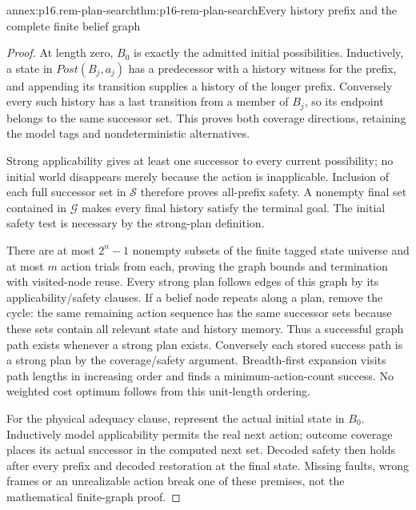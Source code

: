 \begin{annexitem}{annex:p16.rem-plan-search}{thm:p16-rem-plan-search}{Every history prefix and the complete finite belief graph}
\begin{proof}
At length zero, \(B_0\) is exactly the admitted initial possibilities.
Inductively, a state in \(Post(B_j,a_j)\) has a predecessor with a
history witness for the prefix, and appending its transition supplies a
history of the longer prefix. Conversely every such history has a last
transition from a member of \(B_j\), so its endpoint belongs to the
same successor set. This proves both coverage directions, retaining the
model tags and nondeterministic alternatives.

Strong applicability gives at least one successor to every current
possibility; no initial world disappears merely because the action is
inapplicable. Inclusion of each full successor set in \(\mathcal S\)
therefore proves all-prefix safety. A nonempty final set contained in
\(\mathcal G\) makes every final history satisfy the terminal goal.
The initial safety test is necessary by the strong-plan definition.

There are at most \(2^n-1\) nonempty subsets of the finite tagged state
universe and at most \(m\) action trials from each, proving the graph
bounds and termination with visited-node reuse. Every strong plan follows
edges of this graph by its applicability/safety clauses. If a belief node
repeats along a plan, remove the cycle: the same remaining action sequence
has the same successor sets because these sets contain all relevant state
and history memory. Thus a successful graph path exists whenever a strong
plan exists. Conversely each stored success path is a strong plan by the
coverage/safety argument. Breadth-first expansion visits path lengths in
increasing order and finds a minimum-action-count success. No weighted
cost optimum follows from this unit-length ordering.

For the physical adequacy clause, represent the actual initial state in
\(B_0\). Inductively model applicability permits the real next action;
outcome coverage places its actual successor in the computed next set.
Decoded safety then holds after every prefix and decoded restoration at
the final state. Missing faults, wrong frames or an unrealizable action
break one of these premises, not the mathematical finite-graph proof.
\end{proof}
\end{annexitem}

